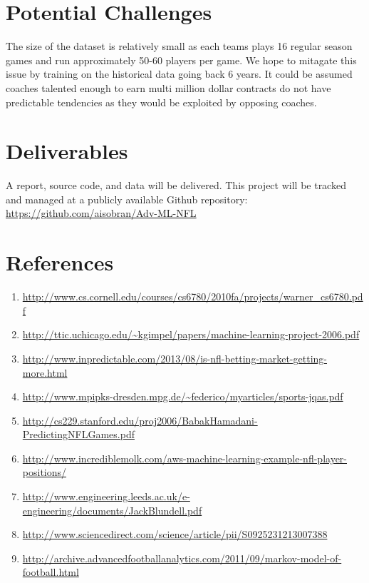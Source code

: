 \documentclass[english]{article}
\begin{document}
\section*{Potential Challenges}
The size of the dataset is relatively small as each teams plays 16 regular season games and run approximately 50-60 players per game. We hope to mitagate this issue by training on the historical data going back 6 years. It could be assumed coaches talented enough to earn multi million dollar contracts do not have predictable tendencies as they would be exploited by opposing coaches. 

\section*{Deliverables}

A report, source code, and data will be delivered. This project will be tracked and managed at a publicly available Github repository: \url{https://github.com/aisobran/Adv-ML-NFL}

\section*{References}
\begin{enumerate}
\item \url{http://www.cs.cornell.edu/courses/cs6780/2010fa/projects/warner_cs6780.pdf}
\item \url{http://ttic.uchicago.edu/~kgimpel/papers/machine-learning-project-2006.pdf}
\item \url{ http://www.inpredictable.com/2013/08/is-nfl-betting-market-getting-more.html}
\item \url{http://www.mpipks-dresden.mpg.de/~federico/myarticles/sports-jqas.pdf}
\item \url{http://cs229.stanford.edu/proj2006/BabakHamadani-PredictingNFLGames.pdf}
\item \url{http://www.incrediblemolk.com/aws-machine-learning-example-nfl-player-positions/}
\item \url{http://www.engineering.leeds.ac.uk/e-engineering/documents/JackBlundell.pdf}
\item \url{http://www.sciencedirect.com/science/article/pii/S0925231213007388}
\item \url{http://archive.advancedfootballanalytics.com/2011/09/markov-model-of-football.html}
\end{enumerate}
\end{document}
